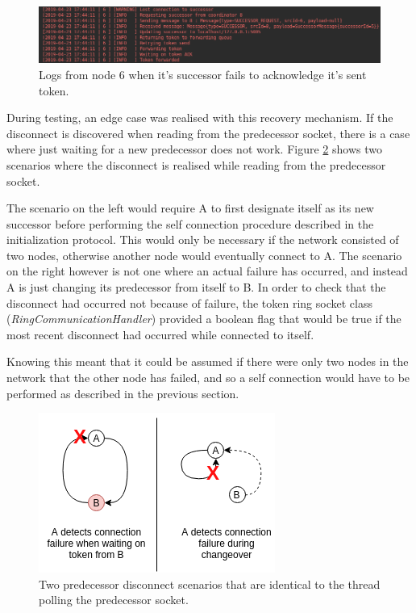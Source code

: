 \documentclass[12pt]{article}
\begin{document}
\begin{figure}[!ht]
	\centering
	\includegraphics[width=\linewidth]{images/recovery}
	\caption{Logs from node 6 when it's successor fails to acknowledge it's sent token.}
	\label{fig:recovery}
\end{figure}

During testing, an edge case was realised with this recovery mechanism. If the disconnect is discovered when reading from the predecessor socket, there is a case where just waiting for a new predecessor does not work. Figure \ref{fig:hard} shows two scenarios where the disconnect is realised while reading from the predecessor socket. 

The scenario on the left would require A to first designate itself as its new successor before performing the self connection procedure described in the initialization protocol. This would only be necessary if the network consisted of two nodes, otherwise another node would eventually connect to A. The scenario on the right however is not one where an actual failure has occurred, and instead A is just changing its predecessor from itself to B. In order to check that the disconnect had occurred not because of failure, the token ring socket class (\emph{RingCommunicationHandler}) provided a boolean flag that would be true if the most recent disconnect had occurred while connected to itself. 

Knowing this meant that it could be assumed if there were only two nodes in the network that the other node has failed, and so a self connection would have to be performed as described in the previous section.

\begin{figure}[!ht]
	\centering
	\includegraphics[width=0.6\linewidth]{images/hard}
	\caption{Two predecessor disconnect scenarios that are identical to the thread polling the predecessor socket.}
	\label{fig:hard}
\end{figure}
\end{document}
